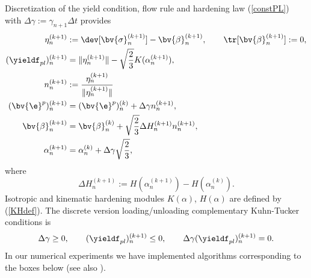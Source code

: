 Discretization of the yield condition, flow rule and hardening law (\ref{constPL}) with $\Delta \gamma := \gamma_{n+1} \Delta t$ provides
\begin{align}
\eta^{(k+1)}_n &:= \dev [\bv{\sigma}^{(k+1)}_n] - \bv{\beta}^{(k+1)}_n, \qquad \tr[\bv{\beta}^{(k+1)}_n] := 0, \nonumber \\
(\yieldf_{pl})^{(k+1)}_n &= \|\eta^{(k+1)}_n\| - \sqrt{\dfrac{2}{3}} K(\alpha^{(k+1)}_n), \nonumber \\
n^{(k+1)}_n &:= \dfrac{\eta^{(k+1)}_n}{\|\eta^{(k+1)}_n\|} \nonumber \\
(\bv{\e}^p)^{(k+1)}_n &= (\bv{\e}^p)^{(k)}_n + \Delta \gamma n^{(k+1)}_n, \label{constPLdiscr} \\
\bv{\beta}^{(k+1)}_n &= \bv{\beta}^{(k)}_n + \sqrt{\dfrac{2}{3}} \Delta H^{(k+1)}_n n^{(k+1)}_n, \nonumber \\
\alpha^{(k+1)}_n &= \alpha^{(k)}_n + \Delta \gamma \sqrt{\dfrac{2}{3}}, \nonumber
\end{align}
where
\[
\Delta H^{(k+1)}_n := H(\alpha^{(k+1)}_n) - H(\alpha^{(k)}_n).
\]
Isotropic  and kinematic  hardening modules $K(\alpha)$, $H(\alpha)$ are defined by (\ref{KHdef}).
The discrete version loading/unloading complementary Kuhn-Tucker conditions is
\begin{equation} \label{discrKunhTucker}
\Delta \gamma \geq 0, 
\qquad (\yieldf_{pl})^{(k+1)}_n \leq 0,
\qquad \Delta \gamma (\yieldf_{pl})^{(k+1)}_n = 0.
\end{equation}
In our numerical experiments we have implemented algorithms corresponding to the boxes below (see also \cite{SiHu98}).

